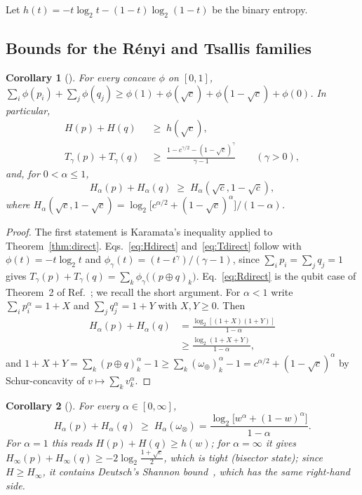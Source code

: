 \documentclass[aps,pra,twocolumn,superscriptaddress,nofootinbib,floatfix]{revtex4-2}
\newtheorem{corollary}{Corollary}
\theoremstyle{definition}
\newcommand{\omplus}{\omega_{\oplus}}
\newcommand{\omtimes}{\omega_{\otimes}}
\newcommand{\sqc}{\sqrt{c}}
\begin{document}
Let $h(t)=-t\log_2t-(1-t)\log_2(1-t)$ be the binary entropy.

\subsection{Bounds for the R\'enyi and Tsallis families}

\begin{corollary}[\cite{RPZ2014}]
\label{cor:direct}
For every concave $\phi$ on $[0,1]$,
$\sum_i\phi(p_i)+\sum_j\phi(q_j)\ge\phi(1)+\phi(\sqc)+\phi(1-\sqc)+\phi(0)$.
In particular,
\begin{align}
  H(p)+H(q)&\;\ge\;h(\sqc) ,
  \label{eq:Hdirect}\\
  T_\gamma(p)+T_\gamma(q)&\;\ge\;\frac{1-c^{\gamma/2}-(1-\sqc)^\gamma}{\gamma-1}\qquad(\gamma>0),
  \label{eq:Tdirect}
\end{align}
and, for $0<\alpha\le1$,
\begin{equation}
  H_\alpha(p)+H_\alpha(q)\;\ge\;H_\alpha(\sqc,1-\sqc),
  \label{eq:Rdirect}
\end{equation}
where $H_\alpha(\sqc,1-\sqc)=\log_2\bigl[c^{\alpha/2}+(1-\sqc)^\alpha\bigr]/(1-\alpha)$.
\end{corollary}

\begin{proof}
The first statement is Karamata's inequality applied to Theorem~\ref{thm:direct}.
Eqs.~\eqref{eq:Hdirect} and~\eqref{eq:Tdirect} follow with $\phi(t)=-t\log_2t$
and $\phi_\gamma(t)=(t-t^\gamma)/(\gamma-1)$, since $\sum_ip_i=\sum_jq_j=1$ gives
$T_\gamma(p)+T_\gamma(q)=\sum_k\phi_\gamma\bigl((p\oplus q)_k\bigr)$.
Eq.~\eqref{eq:Rdirect} is the qubit case of Theorem~2 of Ref.~\cite{RPZ2014};
we recall the short argument. For $\alpha<1$ write $\sum_ip_i^\alpha=1+X$ and
$\sum_jq_j^\alpha=1+Y$ with $X,Y\ge0$. Then
\begin{align*}
  H_\alpha(p)+H_\alpha(q)&=\frac{\log_2[(1+X)(1+Y)]}{1-\alpha}\\
  &\ge\frac{\log_2(1+X+Y)}{1-\alpha},
\end{align*}
and $1+X+Y=\sum_k(p\oplus q)_k^\alpha-1\ge\sum_k(\omplus)_k^\alpha-1=c^{\alpha/2}+(1-\sqc)^\alpha$
by Schur-concavity of $v\mapsto\sum_kv_k^\alpha$.
\end{proof}

\begin{corollary}[\cite{FGG2013,PRZ2013}]
\label{cor:tensor}
For every $\alpha\in[0,\infty]$,
\begin{equation}
  H_\alpha(p)+H_\alpha(q)\;\ge\;H_\alpha(\omtimes)=\frac{\log_2\!\bigl[w^\alpha+(1-w)^\alpha\bigr]}{1-\alpha}.
  \label{eq:Rtensor}
\end{equation}
For $\alpha=1$ this reads $H(p)+H(q)\ge h(w)$; for $\alpha=\infty$ it gives
$H_\infty(p)+H_\infty(q)\ge-2\log_2\frac{1+\sqc}{2}$, which is tight (bisector
state); since $H\ge H_\infty$, it contains Deutsch's Shannon
bound~\cite{Deutsch1983}, which has the same right-hand side.
\end{corollary}
\end{document}
